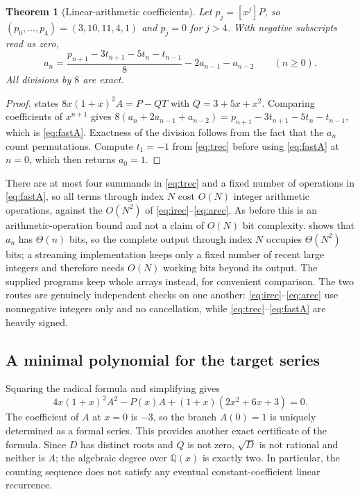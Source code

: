 \documentclass[11pt,letterpaper]{article}
\numberwithin{equation}{section}
\newtheorem{theorem}{Theorem}[section]
\theoremstyle{definition}
\newcommand{\Q}{\mathbb Q}
\newcommand{\coeff}[2]{[#1^{#2}]}
\begin{document}
\begin{theorem}[Linear-arithmetic coefficients]
\label{thm:fastA}
Let $p_j=\coeff{x}{j}P$, so $(p_0,\ldots,p_4)=(3,10,11,4,1)$ and $p_j=0$
for $j>4$. With negative subscripts read as zero,
\begin{equation}
 \boxed{\displaystyle
 a_n=\frac{p_{n+1}-3t_{n+1}-5t_n-t_{n-1}}8-2a_{n-1}-a_{n-2}
 \qquad(n\ge0).}
 \label{eq:fastA}
\end{equation}
All divisions by $8$ are exact.
\end{theorem}
\begin{proof}
 states $8x(1+x)^2A=P-QT$ with $Q=3+5x+x^2$. Comparing
coefficients of $x^{n+1}$ gives
$8(a_n+2a_{n-1}+a_{n-2})=p_{n+1}-3t_{n+1}-5t_n-t_{n-1}$, which is
\eqref{eq:fastA}. Exactness of the division follows from the fact that
the $a_n$ count permutations. Compute $t_1=-1$ from \eqref{eq:trec}
before using \eqref{eq:fastA} at $n=0$, which then returns $a_0=1$.
\end{proof}

There are at most four summands in \eqref{eq:trec} and a fixed number of
operations in \eqref{eq:fastA}, so all terms through index $N$ cost
$O(N)$ integer arithmetic operations, against the $O(N^2)$ of
\eqref{eq:irec}--\eqref{eq:arec}. As before this is an
arithmetic-operation bound and not a claim of $O(N)$ bit complexity.
 shows that $a_n$ has $\Theta(n)$ bits, so the
complete output through index $N$ occupies $\Theta(N^2)$ bits; a
streaming implementation keeps only a fixed number of recent large
integers and therefore needs $O(N)$ working bits beyond its output.
The supplied programs keep whole arrays instead, for convenient
comparison. The two routes are genuinely independent checks on one
another: \eqref{eq:irec}--\eqref{eq:arec} use nonnegative integers only
and no cancellation, while \eqref{eq:trec}--\eqref{eq:fastA} are heavily
signed.

\subsection{A minimal polynomial for the target series}

Squaring the radical formula and simplifying gives
\begin{equation}
 \boxed{4x(1+x)^2A^2-P(x)A+(1+x)(2x^2+6x+3)=0.}
 \label{eq:Apoly}
\end{equation}
The coefficient of $A$ at $x=0$ is $-3$, so the branch $A(0)=1$ is
uniquely determined as a formal series. This provides another exact
certificate of the formula. Since $D$ has distinct roots and $Q$ is
not zero, $\sqrt D$ is not rational and neither is $A$; the algebraic
degree over $\Q(x)$ is exactly two. In particular, the counting sequence
does not satisfy any eventual constant-coefficient linear recurrence.
\end{document}
